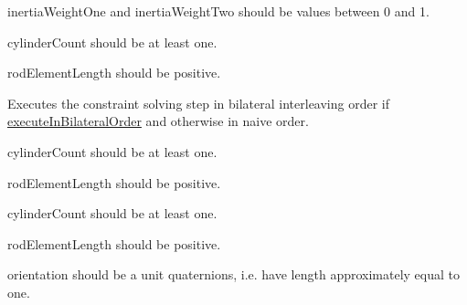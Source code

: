 \begin{DoxyRefList}
{\ttfamily inertia\+Weight\+One} and {\ttfamily inertia\+Weight\+Two} should be values between 0 and 1.  
\item[Member \mbox{\hyperlink{class_guidewire_sim_1_1_constraint_solving_step_abb0819dc303fe77457f315fda13fb59e}{Guidewire\+Sim.Constraint\+Solving\+Step.Solve\+Bend\+Twist\+Constraints}} (BSM.\+Quaternion\mbox{[}\mbox{]} cylinder\+Orientation\+Predictions, int cylinder\+Count, Vector3\mbox{[}\mbox{]} discrete\+Rest\+Darboux\+Vectors, float rod\+Element\+Length)]\label{requirement__requirement000002}%
%
 {\ttfamily cylinder\+Count} should be at least one. 



{\ttfamily rod\+Element\+Length} should be positive. 



Executes the constraint solving step in bilateral interleaving order if \mbox{\hyperlink{class_guidewire_sim_1_1_constraint_solving_step_a5bfee8881a0d715c12f2b8f9cd72df89}{execute\+In\+Bilateral\+Order}} and otherwise in naive order.  
\item[Member \mbox{\hyperlink{class_guidewire_sim_1_1_constraint_solving_step_a2decab310446b017cbac73fed9d62b0a}{Guidewire\+Sim.Constraint\+Solving\+Step.Solve\+Bend\+Twist\+Constraints\+In\+Bilateral\+Order}} (BSM.\+Quaternion\mbox{[}\mbox{]} cylinder\+Orientation\+Predictions, int cylinder\+Count, Vector3\mbox{[}\mbox{]} discrete\+Rest\+Darboux\+Vectors, float rod\+Element\+Length)]\label{requirement__requirement000005}%
%
 {\ttfamily cylinder\+Count} should be at least one. 



{\ttfamily rod\+Element\+Length} should be positive.  
\item[Member \mbox{\hyperlink{class_guidewire_sim_1_1_constraint_solving_step_a93d5ad4d8703c5ae4659f6188c608972}{Guidewire\+Sim.Constraint\+Solving\+Step.Solve\+Bend\+Twist\+Constraints\+In\+Naive\+Order}} (BSM.\+Quaternion\mbox{[}\mbox{]} cylinder\+Orientation\+Predictions, int cylinder\+Count, Vector3\mbox{[}\mbox{]} discrete\+Rest\+Darboux\+Vectors, float rod\+Element\+Length)]\label{requirement__requirement000006}%
%
 {\ttfamily cylinder\+Count} should be at least one. 



{\ttfamily rod\+Element\+Length} should be positive.  
\item[Member \mbox{\hyperlink{class_guidewire_sim_1_1_constraint_solving_step_aa5b56d38bd4e84257628ef413d9b464d}{Guidewire\+Sim.Constraint\+Solving\+Step.Solve\+Stretch\+Constraint}} (Vector3 particle\+Position\+One, Vector3 particle\+Position\+Two, BSM.\+Quaternion orientation, BSM.\+Quaternion e\+\_\+3, float rod\+Element\+Length, out Vector3 delta\+Position\+One, out Vector3 delta\+Position\+Two, out BSM.\+Quaternion delta\+Orientation, float inverse\+Mass\+One=1f, float inverse\+Mass\+Two=1f, float inertia\+Weight=1f)]\label{requirement__requirement000007}%
%
 {\ttfamily orientation} should be a unit quaternions, i.\+e. have length approximately equal to one. 




\end{DoxyRefList}
